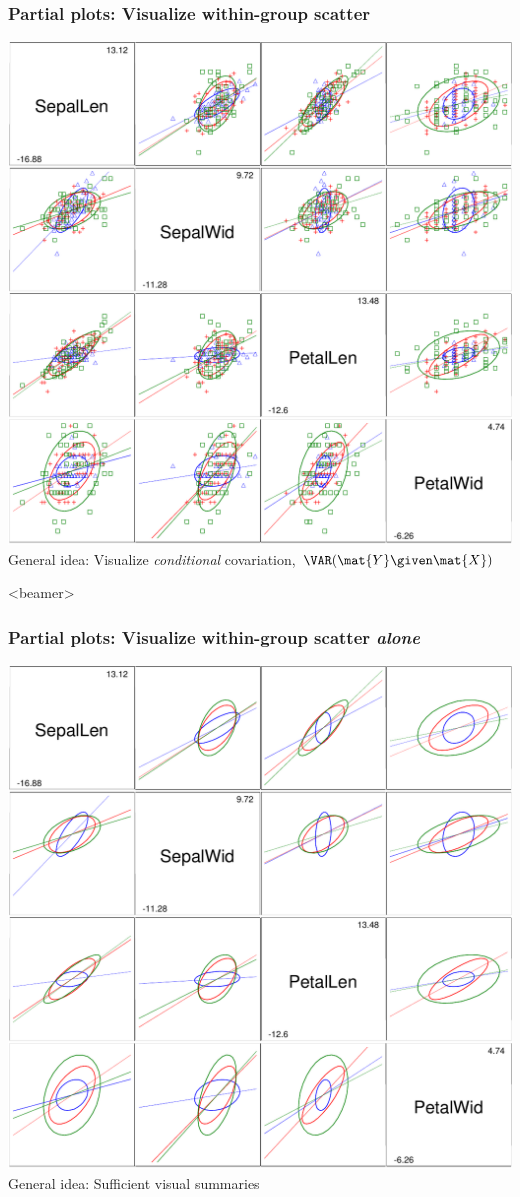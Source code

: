 \begin{frame}
  \frametitle{Partial plots: Visualize within-group scatter}
\begin{center}
  \includegraphics[height=.8\textheight,clip]{fig/scatirisd2}
  \\ General idea: Visualize \emph{conditional} covariation, 
   $\VAR(\mat{Y} \given \mat{X})$
\end{center}
\end{frame}

\begin{frame}<beamer>
  \frametitle{Partial plots: Visualize within-group scatter \emph{alone}}
\begin{center}
  \includegraphics[height=.8\textheight,clip]{fig/scatirisd4}
 \\ General idea: Sufficient visual summaries
\end{center}
\end{frame}


